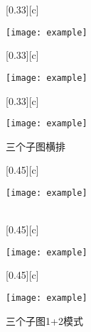 \documentclass[12pt,a4paper,UTF8]{article}
\begin{document}
    \begin{figure}[!htbp]
        \centering
        [0.33\textwidth][c]{
            \centering
            \texttt{[image: example]}
             
        }%
            [0.33\textwidth][c]{
            \centering
            \texttt{[image: example]}
             
        }%
            [0.33\textwidth][c]{
            \centering
            \texttt{[image: example]}
             
        }%
        \caption{三个子图横排}
         
    \end{figure}

    \begin{figure}[!htbp]
        \centering
        [0.45\textwidth][c]{
            \centering
            \texttt{[image: example]}
             
        }\\%
        [0.45\textwidth][c]{
            \centering
            \texttt{[image: example]}
             
        }%
        \hspace{0.3cm}
        [0.45\textwidth][c]{
            \centering
            \texttt{[image: example]}
             
        }%
        \caption{三个子图1+2模式}
         
    \end{figure}
\end{document}
